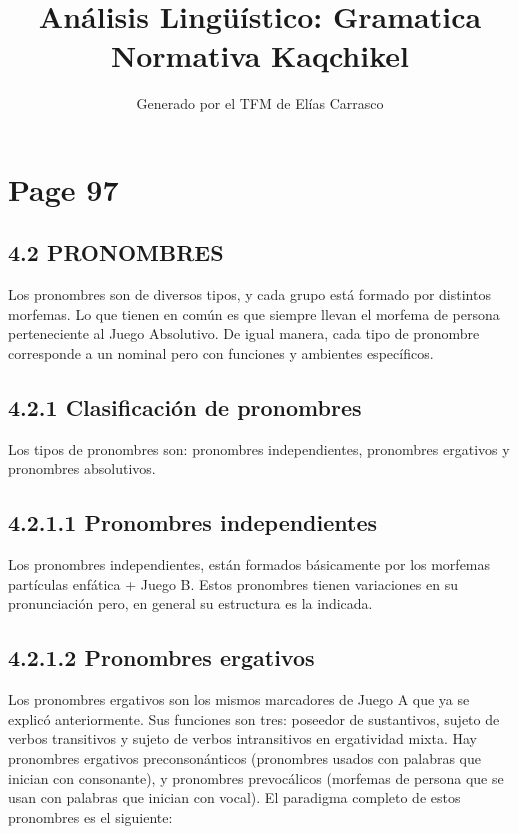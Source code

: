 \documentclass{article}%
\title{Análisis Lingüístico: Gramatica Normativa Kaqchikel}%
\author{Generado por el TFM de Elías Carrasco}%
\begin{document}
%
\normalsize%
\maketitle%
\section{Page 97}%
\label{sec:Page97}%
\subsection{4.2 PRONOMBRES}%
\label{subsec:4.2PRONOMBRES}%

%
Los pronombres son de diversos tipos, y cada grupo está formado por distintos morfemas. Lo que tienen en común es que siempre llevan el morfema de persona perteneciente al Juego Absolutivo. De igual manera, cada tipo de pronombre corresponde a un nominal pero con funciones y ambientes específicos. %
\subsection{4.2.1 Clasificación de pronombres}%
\label{subsec:4.2.1Clasificacindepronombres}%

%
Los tipos de pronombres son: pronombres independientes, pronombres ergativos y pronombres absolutivos. %
\subsection{4.2.1.1 Pronombres independientes}%
\label{subsec:4.2.1.1Pronombresindependientes}%

%
Los pronombres independientes, están formados básicamente por los morfemas partículas enfática + Juego B. Estos pronombres tienen variaciones en su pronunciación pero, en general su estructura es la indicada. %
\subsection{4.2.1.2 Pronombres ergativos}%
\label{subsec:4.2.1.2Pronombresergativos}%

%
Los pronombres ergativos son los mismos marcadores de Juego A que ya se explicó anteriormente. Sus funciones son tres: poseedor de sustantivos, sujeto de verbos transitivos y sujeto de verbos intransitivos en ergatividad mixta. Hay pronombres ergativos preconsonánticos (pronombres usados con palabras que inician con consonante), y pronombres prevocálicos (morfemas de persona que se usan con palabras que inician con vocal). El paradigma completo de estos pronombres es el siguiente: 

%
\end{document}
